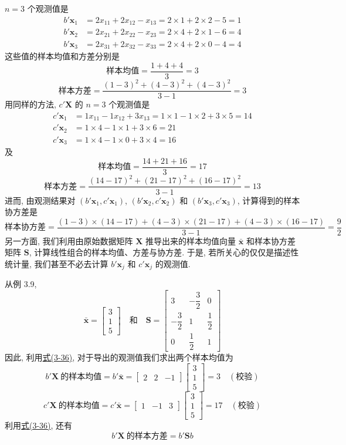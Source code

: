 $n=3$ 个观测值是
\begin{align*}
b'\mathbf{x}_1&=2x_{11}+2x_{12}-x_{13}=2\times1+2\times2-5=1\\
b'\mathbf{x}_2&=2x_{21}+2x_{22}-x_{23}=2\times4+2\times1-6=4\\
b'\mathbf{x}_3&=2x_{31}+2x_{32}-x_{33}=2\times4+2\times0-4=4
\end{align*}
这些值的样本均值和方差分别是
\[
\text{样本均值}=\frac{1+4+4}{3}=3
\]
\[
\text{样本方差}=\frac{(1-3)^2+(4-3)^2+(4-3)^2}{3-1}=3
\]
用同样的方法, $c'\mathbf{X}$ 的 $n=3$ 个观测值是
\begin{align*}
c'\mathbf{x}_1&=1x_{11}-1x_{12}+3x_{13}=1\times1-1\times2+3\times5=14\\
c'\mathbf{x}_2&=1\times4-1\times1+3\times6=21\\
c'\mathbf{x}_3&=1\times4-1\times0+3\times4=16
\end{align*}
及
\[
\text{样本均值}=\frac{14+21+16}{3}=17
\]
\[
\text{样本方差}=\frac{(14-17)^2+(21-17)^2+(16-17)^2}{3-1}=13
\]
进而, 由观测结果对 $(b'\mathbf{x}_1,c'\mathbf{x}_1)$, $(b'\mathbf{x}_2,c'\mathbf{x}_2)$ 和 $(b'\mathbf{x}_3,c'\mathbf{x}_3)$, 计算得到的样本协方差是
\[
\text{样本协方差}=\frac{(1-3)\times(14-17)+(4-3)\times(21-17)+(4-3)\times(16-17)}{3-1}=\frac{9}{2}
\]
另一方面, 我们利用由原始数据矩阵 $\mathbf{X}$ 推导出来的样本均值向量 $\bar{\mathbf{x}}$ 和样本协方差矩阵 $\mathbf{S}$, 计算线性组合的样本均值、方差与协方差. 于是, 若所关心的仅仅是描述性统计量, 我们甚至不必去计算 $b'\mathbf{x}_j$ 和 $c'\mathbf{x}_j$ 的观测值.

从例 3.9,
\[
\bar{\mathbf{x}}=\begin{bmatrix}3\\1\\5\end{bmatrix}
\quad\text{和}\quad
\mathbf{S}=\begin{bmatrix}
3&-\dfrac{3}{2}&0\\[2mm]
-\dfrac{3}{2}&1&\dfrac{1}{2}\\[2mm]
0&\dfrac{1}{2}&1
\end{bmatrix}
\]
因此, 利用\hyperref[eq:3-36]{式(3-36)}, 对于导出的观测值我们求出两个样本均值为
\[
b'\mathbf{X}\ \text{的样本均值}=b'\bar{\mathbf{x}}=\begin{bmatrix}2&2&-1\end{bmatrix}
\begin{bmatrix}3\\1\\5\end{bmatrix}=3 \quad(\text{校验})
\]
\[
c'\mathbf{X}\ \text{的样本均值}=c'\bar{\mathbf{x}}=\begin{bmatrix}1&-1&3\end{bmatrix}
\begin{bmatrix}3\\1\\5\end{bmatrix}=17 \quad(\text{校验})
\]
利用\hyperref[eq:3-36]{式(3-36)}, 还有
\[
b'\mathbf{X}\ \text{的样本方差}=b'\mathbf{S}b
\]
